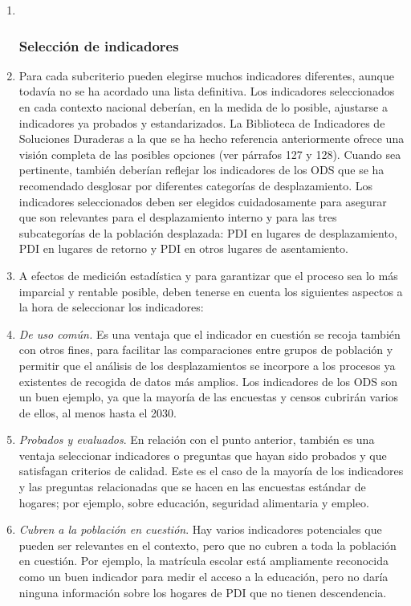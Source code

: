 \documentclass[
]{book}
\begin{document}
\begin{enumerate}
\def\labelenumi{\arabic{enumi}.}
\item ~
  \hypertarget{selecciuxf3n-de-indicadores}{%
  \subsubsection{Selección de indicadores}\label{selecciuxf3n-de-indicadores}}
\item
  Para cada subcriterio pueden elegirse muchos indicadores diferentes, aunque todavía no se ha acordado una lista definitiva. Los indicadores seleccionados en cada contexto nacional deberían, en la medida de lo posible, ajustarse a indicadores ya probados y estandarizados. La Biblioteca de Indicadores de Soluciones Duraderas a la que se ha hecho referencia anteriormente ofrece una visión completa de las posibles opciones (ver párrafos 127 y 128). Cuando sea pertinente, también deberían reflejar los indicadores de los ODS que se ha recomendado desglosar por diferentes categorías de desplazamiento. Los indicadores seleccionados deben ser elegidos cuidadosamente para asegurar que son relevantes para el desplazamiento interno y para las tres subcategorías de la población desplazada: PDI en lugares de desplazamiento, PDI en lugares de retorno y PDI en otros lugares de asentamiento.
\item
  A efectos de medición estadística y para garantizar que el proceso sea lo más imparcial y rentable posible, deben tenerse en cuenta los siguientes aspectos a la hora de seleccionar los indicadores:
\item
  \emph{De uso común.} Es una ventaja que el indicador en cuestión se recoja también con otros fines, para facilitar las comparaciones entre grupos de población y permitir que el análisis de los desplazamientos se incorpore a los procesos ya existentes de recogida de datos más amplios. Los indicadores de los ODS son un buen ejemplo, ya que la mayoría de las encuestas y censos cubrirán varios de ellos, al menos hasta el 2030.
\item
  \emph{Probados y evaluados}. En relación con el punto anterior, también es una ventaja seleccionar indicadores o preguntas que hayan sido probados y que satisfagan criterios de calidad. Este es el caso de la mayoría de los indicadores y las preguntas relacionadas que se hacen en las encuestas estándar de hogares; por ejemplo, sobre educación, seguridad alimentaria y empleo.
\item
  \emph{Cubren a la población en cuestión}. Hay varios indicadores potenciales que pueden ser relevantes en el contexto, pero que no cubren a toda la población en cuestión. Por ejemplo, la matrícula escolar está ampliamente reconocida como un buen indicador para medir el acceso a la educación, pero no daría ninguna información sobre los hogares de PDI que no tienen descendencia.

\end{enumerate}
\end{document}
